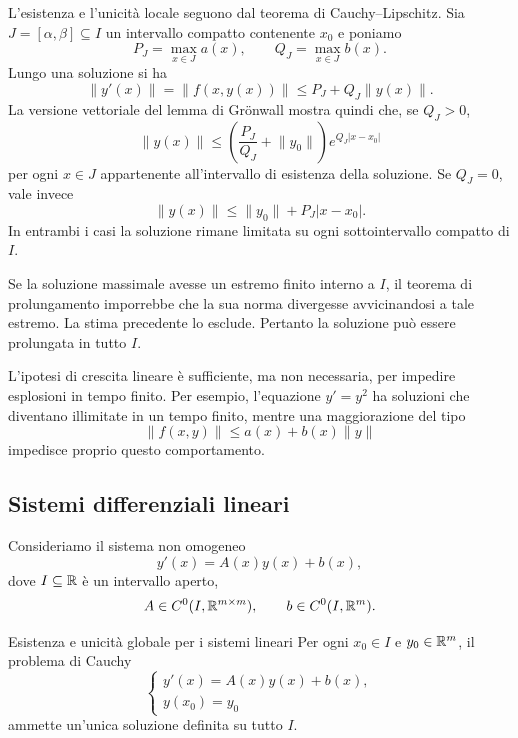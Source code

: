 \documentclass[a4paper]{article}
\begin{document}
\begin{radioactive}
\begin{snippetproof}{}
L'esistenza e l'unicità locale seguono dal teorema di Cauchy--Lipschitz. Sia \(J=[\alpha,\beta]\subseteq I\) un intervallo compatto contenente \(x_0\) e poniamo
\[
	P_J=\max_{x\in J}a(x),
	\qquad
	Q_J=\max_{x\in J}b(x).
\]
Lungo una soluzione si ha
\[
	\lVert y'(x)\rVert
	=\lVert f(x,y(x))\rVert
	\leq P_J+Q_J\lVert y(x)\rVert.
\]
La versione vettoriale del lemma di Grönwall mostra quindi che, se \(Q_J>0\),
\[
	\lVert y(x)\rVert
	\leq
	\left(\frac{P_J}{Q_J}+\lVert y_0\rVert\right)e^{Q_J|x-x_0|}
\]
per ogni \(x\in J\) appartenente all'intervallo di esistenza della soluzione. Se \(Q_J=0\), vale invece
\[
	\lVert y(x)\rVert\leq\lVert y_0\rVert+P_J|x-x_0|.
\]
In entrambi i casi la soluzione rimane limitata su ogni sottointervallo compatto di \(I\).

Se la soluzione massimale avesse un estremo finito interno a \(I\), il teorema di prolungamento imporrebbe che la sua norma divergesse avvicinandosi a tale estremo. La stima precedente lo esclude. Pertanto la soluzione può essere prolungata in tutto \(I\).
\end{snippetproof}
\end{radioactive}

\begin{radioactive}
L'ipotesi di crescita lineare è sufficiente, ma non necessaria, per impedire esplosioni in tempo finito. Per esempio, l'equazione \(y'=y^2\) ha soluzioni che diventano illimitate in un tempo finito, mentre una maggiorazione del tipo
\[
	\lVert f(x,y)\rVert\leq a(x)+b(x)\lVert y\rVert
\]
impedisce proprio questo comportamento.
\end{radioactive}

\subsection{Sistemi differenziali lineari}

\begin{radioactive}
Consideriamo il sistema non omogeneo
\[
	\tag{E}
	y'(x)=A(x)y(x)+b(x),
\]
dove \(I\subseteq\mathbb{R}\) è un intervallo aperto,
\[
	A\in C^0(I,\mathbb{R}^{m\times m}),
	\qquad
	b\in C^0(I,\mathbb{R}^m).
\]
\end{radioactive}

\begin{radioactive}
\begin{snippetcorollary}{Esistenza e unicità globale per i sistemi lineari}
Per ogni \(x_0\in I\) e \(y_0\in\mathbb{R}^m\), il problema di Cauchy
\[
	\begin{cases}
		y'(x)=A(x)y(x)+b(x),\\
		y(x_0)=y_0
	\end{cases}
\]
ammette un'unica soluzione definita su tutto \(I\).
\end{snippetcorollary}
\end{radioactive}
\end{document}
